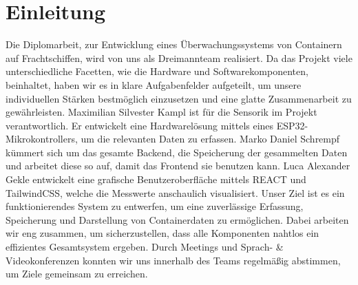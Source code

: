 \documentclass[
    headings=optiontotocandhead,%
    twoside,
    numbers=noenddot,%
    12pt, %
    titlepage, %
    parskip=full, %
    listof=leveldown, 
    numbers=noenddot, %
    a4paper,DIV=14,
    BCOR=15mm,
]{scrbook}
\makeatletter
\newcommand*{\the@orig@section}{}
\let\the@orig@section\section
\renewcommand*{\section}{%
  \clearpage
  \the@orig@section
}
\makeatother
\begin{document}



\cleardoublepage{}
\setcounter{tocdepth}{3}
\tableofcontents{}

\raggedbottom
\cleardoublepage{}
\mainmatter
\hypertarget{einleitung}{%
\section{Einleitung}\label{einleitung}}

Die Diplomarbeit, zur Entwicklung eines Überwachungssystems von
Containern auf Frachtschiffen, wird von uns als Dreimannteam realisiert.
Da das Projekt viele unterschiedliche Facetten, wie die Hardware und
Softwarekomponenten, beinhaltet, haben wir es in klare Aufgabenfelder
aufgeteilt, um unsere individuellen Stärken bestmöglich einzusetzen und
eine glatte Zusammenarbeit zu gewährleisten. Maximilian Silvester Kampl
ist für die Sensorik im Projekt verantwortlich. Er entwickelt eine
Hardwarelösung mittels eines ESP32-Mikrokontrollers, um die relevanten
Daten zu erfassen. Marko Daniel Schrempf kümmert sich um das gesamte
Backend, die Speicherung der gesammelten Daten und arbeitet diese so
auf, damit das Frontend sie benutzen kann. Luca Alexander Gekle
entwickelt eine grafische Benutzeroberfläche mittels REACT und
TailwindCSS, welche die Messwerte anschaulich visualisiert. Unser Ziel
ist es ein funktionierendes System zu entwerfen, um eine zuverlässige
Erfassung, Speicherung und Darstellung von Containerdaten zu
ermöglichen. Dabei arbeiten wir eng zusammen, um sicherzustellen, dass
alle Komponenten nahtlos ein effizientes Gesamtsystem ergeben. Durch
Meetings und Sprach- \& Videokonferenzen konnten wir uns innerhalb des
Teams regelmäßig abstimmen, um Ziele gemeinsam zu erreichen.
\end{document}

